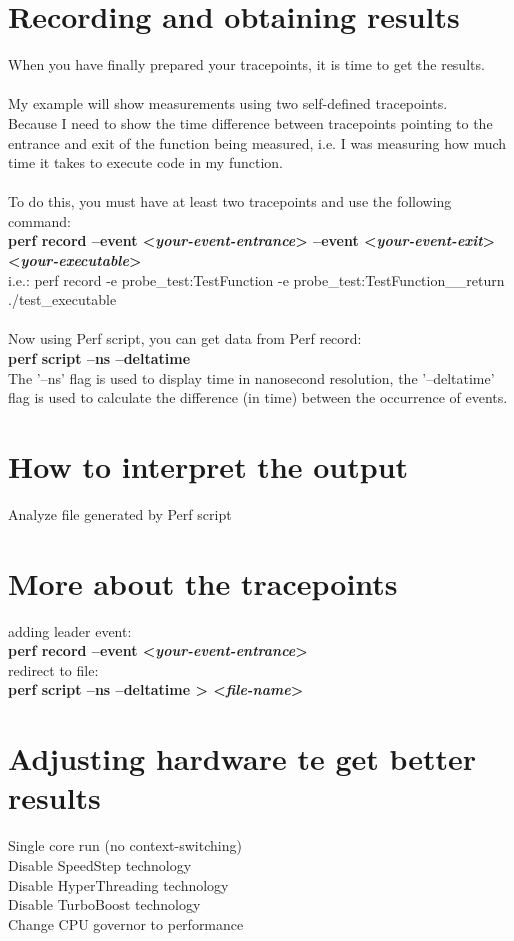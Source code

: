 \documentclass[11pt,onecolumn]{article}
\begin{document}
\section{Recording and obtaining results}

When you have finally prepared your tracepoints, it is time to get the results.\\\\
My example will show measurements using two self-defined tracepoints.\\
Because I need to show the time difference between tracepoints pointing to the entrance and exit of the function being measured, i.e. I was measuring how much time it takes to execute code in my function.\\\\
To do this, you must have at least two tracepoints and use the following command:\\
\textbf{perf record --event <\textit{your-event-entrance}> --event <\textit{your-event-exit}> <\textit{your-executable}>}\\
i.e.: perf record -e probe\_test:TestFunction -e probe\_test:TestFunction\_\_return ./test\_executable\\\\
Now using Perf script, you can get data from Perf record:\\
\textbf{perf script --ns --deltatime}\\
The '--ns' flag is used to display time in nanosecond resolution, the '--deltatime' flag is used to calculate the difference (in time) between the occurrence of events.


\section{How to interpret the output}

Analyze file generated by Perf script

\section{More about the tracepoints}

adding leader event:\\
\textbf{perf record --event <\textit{your-event-entrance}>}\\
redirect to file:\\
\textbf{perf script --ns --deltatime > <\textit{file-name}>}\\

\section{Adjusting hardware te get better results}

Single core run (no context-switching)\\
Disable SpeedStep technology\\
Disable HyperThreading technology\\
Disable TurboBoost technology\\
Change CPU governor to performance
\end{document}
